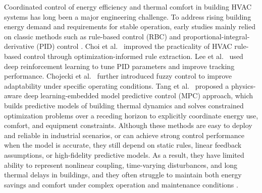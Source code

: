\documentclass[preprint,12pt,number]{elsarticle}
\begin{document}
Coordinated control of energy efficiency and thermal comfort in building HVAC systems has long been a major engineering challenge. To address rising building energy demand and requirements for stable operation, early studies mainly relied on classic methods such as rule-based control (RBC) and proportional-integral-derivative (PID) control \cite{ref12}. Choi et al.~\cite{ref13} improved the practicality of HVAC rule-based control through optimization-informed rule extraction. Lee et al.~\cite{ref14} used deep reinforcement learning to tune PID parameters and improve tracking performance. Chojecki et al.~\cite{ref15} further introduced fuzzy control to improve adaptability under specific operating conditions. Tang et al.~\cite{ref16} proposed a physics-aware deep learning-embedded model predictive control (MPC) approach, which builds predictive models of building thermal dynamics and solves constrained optimization problems over a receding horizon to explicitly coordinate energy use, comfort, and equipment constraints. Although these methods are easy to deploy and reliable in industrial scenarios, or can achieve strong control performance when the model is accurate, they still depend on static rules, linear feedback assumptions, or high-fidelity predictive models. As a result, they have limited ability to represent nonlinear coupling, time-varying disturbances, and long thermal delays in buildings, and they often struggle to maintain both energy savings and comfort under complex operation and maintenance conditions \cite{ref17}.
\end{document}
